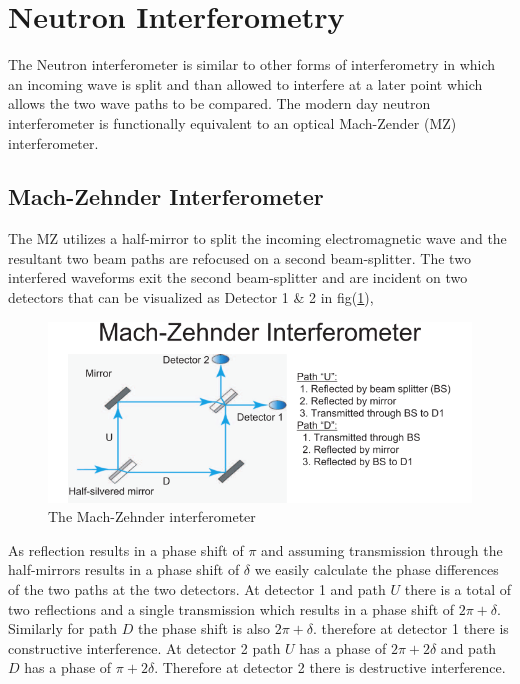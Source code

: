 \section{Neutron Interferometry}
The Neutron interferometer is similar to other forms of interferometry in which an incoming wave is split and than allowed to interfere at a later point which allows the two wave paths to be compared. The modern day neutron interferometer is functionally equivalent to an optical Mach-Zender (MZ) interferometer.

\subsection{Mach-Zehnder Interferometer}

The MZ utilizes a half-mirror to split the incoming electromagnetic wave and the resultant two beam paths are refocused on a second beam-splitter. The two interfered waveforms exit the second beam-splitter and are incident on two detectors that can be visualized as Detector 1 \& 2 in fig(\ref{mach-zehnder}),

\begin{figure}[ht!]
\centering
\includegraphics[scale=1.0]{Figures/mach-zender.png}
\caption{The Mach-Zehnder interferometer}
\label{mach-zehnder}
\end{figure}

As reflection results in a phase shift of $\pi$ and assuming transmission through the half-mirrors results in a phase shift of $\delta$ we easily calculate the phase differences of the two paths at the two detectors. At detector 1 and path $U$ there is a total of two reflections and a single transmission which results in a phase shift of $2\pi+\delta$. Similarly for path $D$ the phase shift is also $2\pi + \delta$. therefore at detector 1 there is constructive interference. At detector 2 path $U$ has a phase of $2\pi + 2\delta$ and path $D$ has a phase of $\pi + 2\delta$. Therefore at detector 2 there is destructive interference.\cite{dimaThesis}



